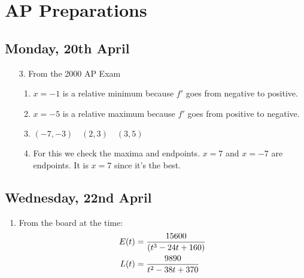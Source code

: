\documentclass[11pt]{article}
\begin{document}
\section{AP Preparations}
\subsection{Monday, 20th April}
\begin{enumerate}
	\item[3. ] From the 2000 AP Exam
		\begin{enumerate}
			\item $x = -1$ is a relative minimum because $f\prime$ goes
				from negative to positive.
			\item $x = -5$ is a relative maximum because $f\prime$ goes
				from positive to negative.
			\item $(-7, -3) \quad (2, 3) \quad (3, 5)$
			\item For this we check the maxima and endpoints.  $x = 7$
				and $x = -7$ are endpoints.  It is $x = 7$ since it's 
				the best.
		\end{enumerate}
\end{enumerate}

\subsection{Wednesday, 22nd April}
\begin{enumerate}
	\item From the board at the time:
		\begin{align}
			\setcounter{equation}{0}
			E(t) &= \frac{15600}{(t^3-24t+160)} \\
			L(t) &= \frac{9890}{t^2-38t+370}
		\end{align}
\end{enumerate}
\end{document}
